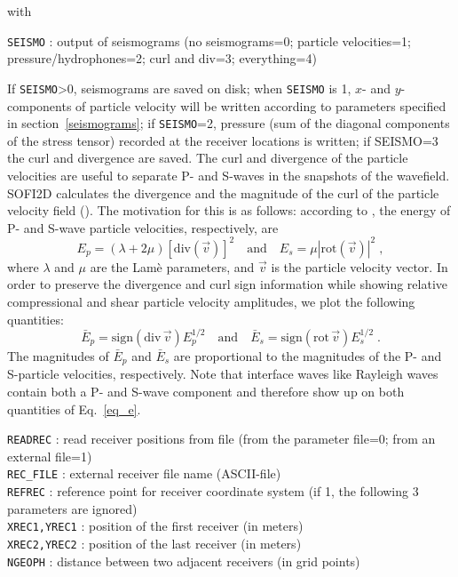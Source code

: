 with

\texttt{SEISMO} : output of seismograms (no seismograms=0; particle velocities=1; pressure/hydrophones=2; curl and div=3; everything=4)

If \texttt{SEISMO}>0, seismograms are saved on disk; when \texttt{SEISMO} is 1, $x$- and $y$-components of particle velocity will be written according to parameters specified in section~\ref{seismograms}; if \texttt{SEISMO}=2, pressure (sum of the diagonal components of the stress tensor) recorded at the receiver locations is written; if SEISMO=3 the curl and divergence are saved. The curl and divergence of the particle velocities are useful to separate P- and S-waves in the snapshots of the wavefield. SOFI2D calculates the divergence and the magnitude of the curl of the particle velocity field (\cite{dougherty:88}). The motivation for this is as follows: according to \citet{morse:53}, the energy of P- and S-wave particle velocities, respectively, are
\begin{equation}
    E_p=\left(\lambda + 2 \mu\right) \left[ \text{div}(\vec{v}) \right]^2 \quad \mbox{and} \quad E_s=\mu \left|\text{rot}(\vec{v})\right|^2\;,
    \label{eq_E}
\end{equation}
where $\lambda$ and $\mu$ are the Lam\`{e} parameters, and $\vec{v}$ is the particle velocity vector. In order to preserve the divergence and curl sign information  while showing relative compressional and shear particle velocity amplitudes, we plot the following quantities:
\begin{equation}
    \bar{E}_p = \text{sign}(\text{div}\,\vec{v}) E_p^{1/2} \quad \mbox{and} \quad \bar{E}_s= \text{sign}(\text{rot}\,\vec{v}) E_s^{1/2}\;.
    \label{eq_e}
\end{equation}
The magnitudes of $\bar{E}_p$ and $\bar{E}_s$ are proportional to the magnitudes of the P- and S-particle velocities, respectively. Note that interface waves like Rayleigh waves contain both a P- and S-wave component and therefore show up on both quantities of Eq.~\ref{eq_e}.

\texttt{READREC} : read receiver positions from file (from the parameter file=0; from an external file=1)\\
\texttt{REC\_FILE} : external receiver file name (ASCII-file)\\
\texttt{REFREC} : reference point for receiver coordinate system (if 1, the following 3 parameters are ignored)\\
\texttt{XREC1,YREC1} : position of the first receiver (in meters) \\
\texttt{XREC2,YREC2} : position of the last receiver (in meters)\\
\texttt{NGEOPH} : distance between two adjacent receivers (in grid points)

